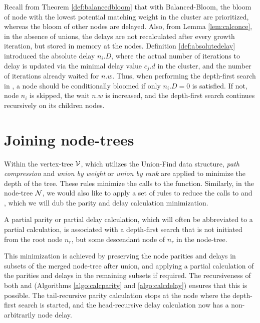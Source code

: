 Recall from Theorem \ref{def:balancedbloom} that with Balanced-Bloom, the bloom of node with the lowest potential matching weight in the cluster are prioritized, whereas the bloom of other nodes are delayed. Also, from Lemma \ref{lem:calconce}, in the absence of unions, the delays are not recalculated after every growth iteration, but stored in memory at the nodes. Definition \ref{def:absolutedelay} introduced the absolute delay $n_i.D$, where the actual number of iterations to delay is updated via the minimal delay value $c_j.d$ in the cluster, and the number of iterations already waited for $n.w$. Thus, when performing the depth-first search in , a node should be conditionally bloomed if only $n_i.D = 0$ is satisfied. If not, node $n_i$ is skipped, the wait $n.w$ is increased, and the depth-first search continues recursively on its children nodes. 




\section{Joining node-trees}\label{sec:nodejoin}
Within the vertex-tree $\mathcal{V}$, which utilizes the Union-Find data structure, \emph{path compression} and \emph{union by weight} or \emph{union by rank} are applied to minimize the depth of the tree. These rules minimize the calls to the  function. Similarly, in the node-tree $\mathcal{N}$, we would also like to apply a set of rules to reduce the calls to  and , which we will dub the parity and delay calculation minimization.

\begin{definition}\label{def:partialpdc}
  A partial parity or partial delay calculation, which will often be abbreviated to a partial calculation, is associated with a depth-first search that is not initiated from the root node $n_r$, but some descendant node of $n_r$ in the node-tree. 
\end{definition}

This minimization is achieved by preserving the node parities and delays in subsets of the merged node-tree after union, and applying a partial calculation of the parities and delays in the remaining subsets if required. The recursiveness of both  and  (Algorithms \ref{algo:calcparity} and \ref{algo:calcdelay}) ensures that this is possible. The tail-recursive parity calculation stops at the node where the depth-first search is started, and the head-recursive delay calculation now has a non-arbitrarily node delay. 

